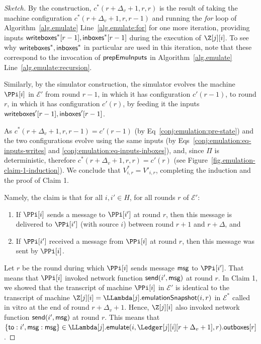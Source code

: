 \begin{proof}[Sketch]
  By the \rollerblade construction,
  $c^*(r + \Delta_v + 1, r, r)$ is the result of
  taking the machine configuration
  $c^*(r + \Delta_v + 1, r, r - 1)$
  and running the \emph{for} loop of Algorithm~\ref{alg.emulate} Line~\ref{alg.emulate:for}
  for one more iteration, providing inputs $\textsf{writeboxes}^*[r - 1], \textsf{inboxes}^*[r - 1]$
  during the execution of $\Z[j][i]$.
  To see why $\textsf{writeboxes}^*, \textsf{inboxes}^*$ in particular are used in this iteration,
  note that these correspond to the invocation of $\textsf{prepEmuInputs}$ in
  Algorithm~\ref{alg.emulate} Line~\ref{alg.emulate:recursion}.

  Similarly, by the simulator construction, %
  the simulator evolves the machine $\PPi[i]$ in $\mathcal{E}'$ from round $r - 1$,
  in which it has configuration $c'(r - 1)$,
  to round $r$,
  in which it has configuration $c'(r)$,
  by feeding it the inputs $\textsf{writeboxes}'[r - 1], \textsf{inboxes}'[r - 1]$.

  As $c^*(r + \Delta_v + 1, r, r - 1) = c'(r - 1)$ (by Eq~\ref{conj:emulation:pre-state})
  and the two configurations evolve using the same inputs (by
  Eqs~\ref{conj:emulation:eq-inputs-writes} and \ref{conj:emulation:eq-inputs-inboxes}),
  and, since $\Pi$ is deterministic,
  therefore $c^*(r + \Delta_v + 1, r, r) = c'(r)$ (see Figure~\ref{fig.emulation-claim-1-induction}).
  We conclude that $V^*_{i,r} = V'_{i,r}$, completing the induction
  and the proof of Claim 1.

  Namely, the claim is that for all $i, i' \in H$, for all rounds $r$ of $\mathcal{E}'$:

  \begin{enumerate}[label=(\alph*)]
    \item
    \label{conj:emulation:claim-delta}
    If $\PPi[i]$ sends a message to $\PPi[i']$ at round $r$, then this message is delivered to $\PPi[i']$
    (with source $i$) between round $r + 1$ and $r + \Delta$, and

    \item
    If $\PPi[i']$ received a message from $\PPi[i]$ at round $r$, then this message was sent by $\PPi[i]$.
  \end{enumerate}

  Let $r$ be the round during which $\PPi[i]$ sends message $\textsf{msg}$ to $\PPi[i']$.
  That means that $\PPi[i]$ invoked network function $\textsf{send}(i', \textsf{msg})$ at round $r$.
  In Claim 1, we showed that the transcript of machine $\PPi[i]$ in $\mathcal{E}'$
  is identical to the transcript of machine $\Z[j][i] = \LLambda[j].\emulationSnapshot(i,r)$ in $\mathcal{E}^*$
  called in vitro at the end of round $r + \Delta_v + 1$.
  Hence, $\Z[j][i]$ also invoked network function $\textsf{send}(i', \textsf{msg})$ at round $r$.
  This means that $\{\textsf{to}: i', \msg: \msg\} \in \LLambda[j].\emulate(i, \Ledger[j][i][r + \Delta_v + 1], r).\outboxes[r]$.


\end{proof}
